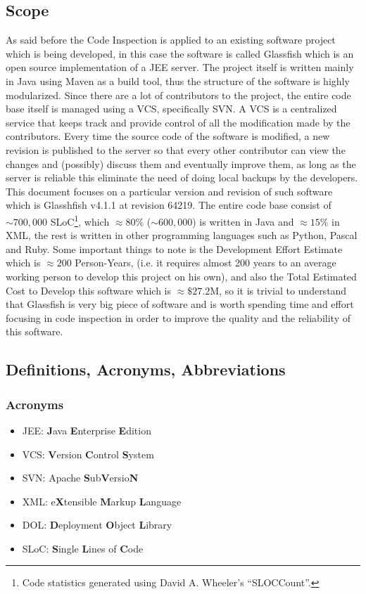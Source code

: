 \subsection{Scope}
As said before the Code Inspection is applied to an existing software project which is being developed, in this case the software is called Glassfish which is an open source implementation of a JEE server.
The project itself is written mainly in Java using Maven as a build tool, thus the structure of the software is highly modularized. \newline
Since there are a lot of contributors to the project, the entire code base itself is managed using a VCS, specifically SVN. A VCS is a centralized service that keeps track and provide control of all the modification made by the contributors. Every time the source code of the software is modified, a new revision is published to the server so that every other contributor can view the changes and (possibly) discuss them and eventually improve them, as long as the server is reliable this eliminate the need of doing local backups by the developers.\newline
This document focuses on a particular version and revision of such software which is Glasshfish v4.1.1 at revision 64219.
The entire code base consist of $\sim 700,000$ SLoC\footnote{Code statistics generated using David A. Wheeler's ``SLOCCount''.}, which $\approx 80\%$ ($\sim 600,000$) is written in Java and $\approx15\%$ in XML, the rest is written in other programming languages such as Python, Pascal and Ruby. Some important things to note is the Development Effort Estimate which is $\approx 200$ Person-Years, (i.e. it requires almost 200 years to an average working person to develop this project on his own), and also the Total Estimated Cost to Develop this software which is $\approx \$27.2$M, so it is trivial to understand that Glassfish is very big piece of software and is worth spending time and effort focusing in code inspection in order to improve the quality and the reliability of this software. 
\subsection{Definitions, Acronyms, Abbreviations}
\subsubsection{Acronyms}
\begin{itemize}
	\item JEE: \textbf{J}ava \textbf{E}nterprise \textbf{E}dition
	\item VCS: \textbf{V}ersion \textbf{C}ontrol \textbf{S}ystem
	\item SVN: Apache \textbf{S}ub\textbf{V}ersio\textbf{N}
	\item XML: e\textbf{X}tensible \textbf{M}arkup \textbf{L}anguage
	\item DOL: \textbf{D}eployment \textbf{O}bject \textbf{L}ibrary
	\item SLoC: \textbf{S}ingle \textbf{L}ines of \textbf{C}ode
\end{itemize}

